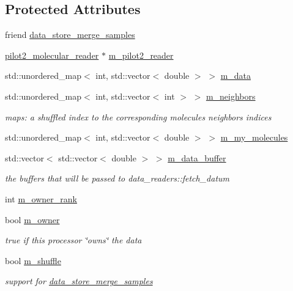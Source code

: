 \subsection*{Protected Attributes}
\begin{DoxyCompactItemize}
\item 
friend \hyperlink{classlbann_1_1data__store__pilot2__molecular_a36aa0ef7fa75daf309b4350ebfdb94be}{data\+\_\+store\+\_\+merge\+\_\+samples}
\item 
\hyperlink{classlbann_1_1pilot2__molecular__reader}{pilot2\+\_\+molecular\+\_\+reader} $\ast$ \hyperlink{classlbann_1_1data__store__pilot2__molecular_a1875ae12fe7c2b11818ddb3fecff9f72}{m\+\_\+pilot2\+\_\+reader}
\item 
std\+::unordered\+\_\+map$<$ int, std\+::vector$<$ double $>$ $>$ \hyperlink{classlbann_1_1data__store__pilot2__molecular_afbb012980857b9841deefb055905e6f5}{m\+\_\+data}
\item 
std\+::unordered\+\_\+map$<$ int, std\+::vector$<$ int $>$ $>$ \hyperlink{classlbann_1_1data__store__pilot2__molecular_a567c6bcdfab6f9248f3c320d505861bc}{m\+\_\+neighbors}
\begin{DoxyCompactList}\small\item\em maps\+: a shuffled index to the corresponding molecule\textquotesingle{}s neighbors\textquotesingle{} indices \end{DoxyCompactList}\item 
std\+::unordered\+\_\+map$<$ int, std\+::vector$<$ double $>$ $>$ \hyperlink{classlbann_1_1data__store__pilot2__molecular_a67fb9174cecff931f61e7f6ca000315b}{m\+\_\+my\+\_\+molecules}
\item 
std\+::vector$<$ std\+::vector$<$ double $>$ $>$ \hyperlink{classlbann_1_1data__store__pilot2__molecular_aad14735a82ce4cdcb153fcca94cd2b41}{m\+\_\+data\+\_\+buffer}
\begin{DoxyCompactList}\small\item\em the buffers that will be passed to data\+\_\+readers\+::fetch\+\_\+datum \end{DoxyCompactList}\item 
int \hyperlink{classlbann_1_1data__store__pilot2__molecular_ad0c7ed6c6858d9958f73000b0b3137ac}{m\+\_\+owner\+\_\+rank}
\item 
bool \hyperlink{classlbann_1_1data__store__pilot2__molecular_a9229deea455ef0a68508e6b956887dd3}{m\+\_\+owner}
\begin{DoxyCompactList}\small\item\em true if this processor \char`\"{}owns\char`\"{} the data \end{DoxyCompactList}\item 
bool \hyperlink{classlbann_1_1data__store__pilot2__molecular_afedbbd7592df7b60c71a7744eb8ccbf9}{m\+\_\+shuffle}
\begin{DoxyCompactList}\small\item\em support for \hyperlink{classlbann_1_1data__store__merge__samples}{data\+\_\+store\+\_\+merge\+\_\+samples} \end{DoxyCompactList}\end{DoxyCompactItemize}


